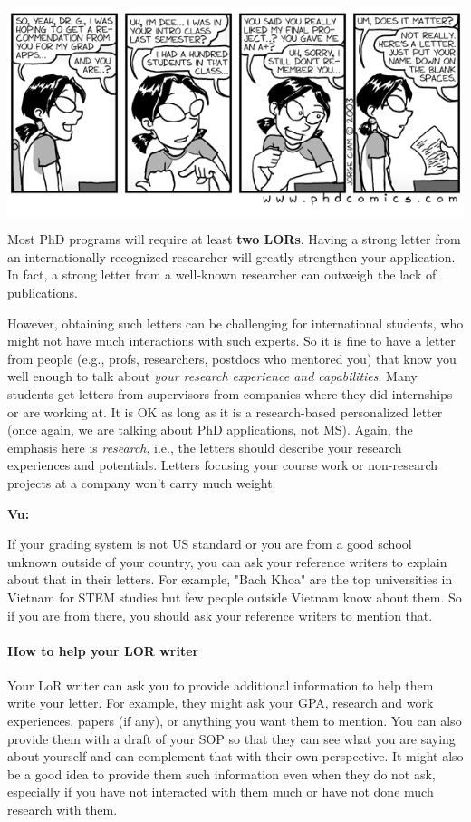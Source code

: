 \documentclass[oneside,11pt]{memoir}
\newenvironment{commentbox}[1][]{
  \small
  \begin{mybox}
    {\small \textbf{#1}}
  }{
  \end{mybox}
}
\begin{document}
\begin{center}
  \includegraphics[width=0.6\linewidth]{files/c6.png}
\end{center}


Most PhD programs will require at least \textbf{two LORs}. Having a strong letter from an internationally recognized researcher will greatly strengthen your application. In fact, a strong letter from a well-known researcher can outweigh the lack of publications.


However, obtaining such letters
can be challenging for international students, who might not have much interactions with such experts. So it is fine to have a letter from people (e.g., profs, researchers, postdocs who mentored you) that know you well enough to talk about \emph{your research experience and capabilities}. Many students get letters from supervisors from companies where they did internships or are working at. It is OK as long as it is a research-based personalized letter (once again, we are talking about PhD applications, not MS). Again, the emphasis here is \emph{research}, i.e., the letters should describe your research experiences and potentials. Letters focusing your course work or non-research projects at a company won't carry much weight.


\begin{commentbox}[Vu:]
  If your grading system is not US standard or you are from a good school unknown outside of your country, you can ask your reference writers to explain about that in their letters.  For example, "Bach Khoa" are the top universities in Vietnam for STEM studies but few people outside Vietnam know about them.  So if you are from there, you should ask your reference writers to mention that.
\end{commentbox}

\paragraph{How to help your LOR writer} Your LoR writer can ask you to provide additional information to help them write your letter.  For example, they might ask your GPA, research and work experiences, papers (if any), or anything you want them to mention. You can also provide them with a draft of your SOP so that they can see what you are saying about yourself and can complement that with their own perspective.  It might also be a good idea to provide them such information even when they do not ask, especially if you have not interacted with them much or have not done much research with them.
\end{document}
